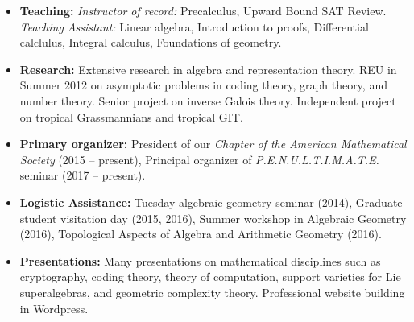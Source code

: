 \documentclass[10pt,a4paper]{article}
\begin{document}
\begin{itemize}
\item \textbf{Teaching:} \emph{Instructor of record:} Precalculus, Upward Bound SAT Review. \emph{Teaching Assistant:} Linear algebra, Introduction to proofs, Differential calclulus, Integral calculus, Foundations of geometry.
\item \textbf{Research:} Extensive research in algebra and representation theory. REU in Summer 2012 on asymptotic problems in coding theory, graph theory, and number theory. Senior project on inverse Galois theory. Independent project on tropical Grassmannians and tropical GIT.
\item \textbf{Primary organizer:} President of our \emph{Chapter of the American Mathematical Society} (2015 -- present), Principal organizer of \emph{P.E.N.U.L.T.I.M.A.T.E.} seminar (2017 -- present).
\item \textbf{Logistic Assistance:} Tuesday algebraic geometry seminar (2014), Graduate student visitation day (2015, 2016), Summer workshop in Algebraic Geometry (2016), Topological Aspects of Algebra and Arithmetic Geometry (2016).
\item \textbf{Presentations:} Many presentations on mathematical disciplines such as cryptography, coding theory, theory of computation, support varieties for Lie superalgebras, and geometric complexity theory. Professional website building in Wordpress. 
\end{itemize}
\end{document}
